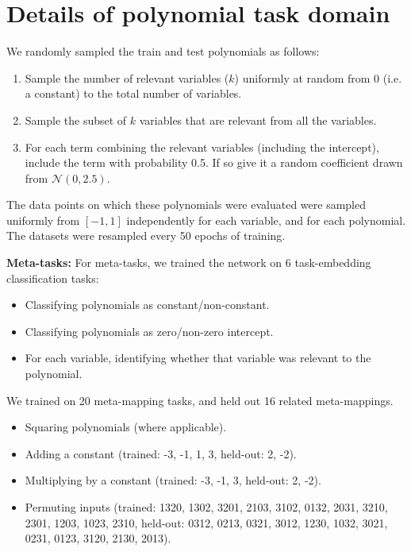 \section{Details of polynomial task domain} \label{app:HoMM:polynomials_methods}
We randomly sampled the train and test polynomials as follows:
\begin{enumerate}
\item Sample the number of relevant variables ($k$) uniformly at random from 0 (i.e. a constant) to the total number of variables.
\item Sample the subset of $k$ variables that are relevant from all the variables.
\item For each term combining the relevant variables (including the intercept), include the term with probability 0.5. If so give it a random coefficient drawn from $\mathcal{N}(0, 2.5)$.
\end{enumerate}
The data points on which these polynomials were evaluated were sampled uniformly from $[-1, 1]$ independently for each variable, and for each polynomial. The datasets were resampled every 50 epochs of training. \par
\textbf{Meta-tasks:} For meta-tasks, we trained the network on 6 task-embedding classification tasks:
\begin{itemize}
\item Classifying polynomials as constant/non-constant.
\item Classifying polynomials as zero/non-zero intercept.
\item For each variable, identifying whether that variable was relevant to the polynomial.
\end{itemize}
We trained on 20 meta-mapping tasks, and held out 16 related meta-mappings.
\begin{itemize}
\item Squaring polynomials (where applicable).
\item Adding a constant (trained: -3, -1, 1, 3, held-out: 2, -2).
\item Multiplying by a constant (trained: -3, -1, 3, held-out: 2, -2).
\item Permuting inputs (trained: 1320, 1302, 3201, 2103, 3102, 0132, 2031, 3210, 2301, 1203, 1023, 2310, held-out: 0312, 0213, 0321, 3012, 1230, 1032, 3021, 0231, 0123, 3120, 2130, 2013).
\end{itemize}



